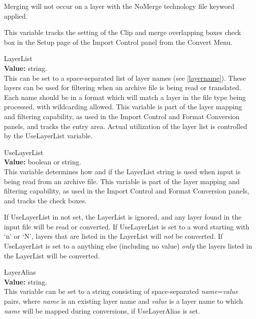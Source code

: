 \begin{description}
Merging will not occur on a layer with the {\vt NoMerge} technology
file keyword applied.
 
This variable tracks the setting of the {\cb Clip and merge
overlapping boxes} check box in the {\cb Setup} page of the {\cb
Import Control} panel from the {\cb Convert Menu}.

\item{\et LayerList}\\
{\bf Value:} string.\\
This can be set to a space-separated list of layer names (see
\ref{layername}).  These layers can be used for filtering when an
archive file is being read or translated.  Each name should be in a
format which will match a layer in the file type being processed, with
wildcarding allowed.  This variable is part of the layer mapping and
filtering capability, as used in the {\cb Import Control} and {\cb
Format Conversion} panels, and tracks the entry area.  Actual
utilization of the layer list is controlled by the {\et UseLayerList}
variable.

\item{\et UseLayerList}\\
{\bf Value:} boolean or string.\\
This variable determines how and if the {\et LayerList} string is used
when input is being read from an archive file.  This variable is part
of the layer mapping and filtering capability, as used in the {\cb
Import Control} and {\cb Format Conversion} panels, and tracks the
check boxes.

If {\et UseLayerList} in not set, the {\et LayerList} is ignored, and
any layer found in the input file will be read or converted.  If {\et
UseLayerList} is set to a word starting with `{\vt n}' or `{\vt N}',
layers that are listed in the {\et LayerList} will {\it not} be
converted.  If {\et UseLayerList} is set to a anything else (including
no value) {\it only} the layers listed in the {\et LayerList} will be
converted.

\item{\et LayerAlias}\\
{\bf Value:} string.\\
This variable can be set to a string consisting of space-separated
{\it name\/}={\it value} pairs, where {\it name} is an existing layer
name and {\it value} is a layer name to which {\it name} will be
mapped during conversions, if {\et UseLayerAlias} is set.


\end{description}
